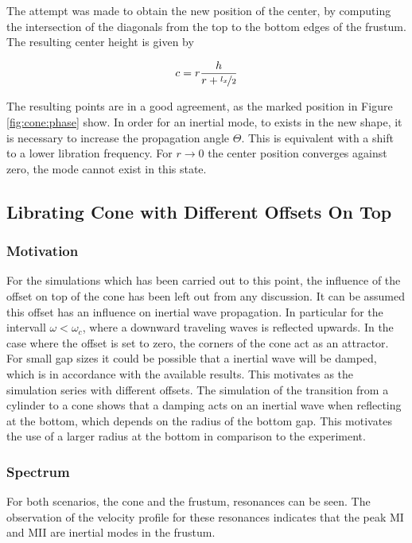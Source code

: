 The attempt was made to obtain the new position of the center,
by computing the intersection of the diagonals from the top to the bottom edges of the frustum.
The resulting center height is given by

\begin{align}
\label{cone:wavenodeeqn}
c  = r \frac{h}{r+\nicefrac{l_x}{2}}
\end{align}

The resulting points are in a good agreement, as the marked position in Figure \ref{fig:cone:phase} show.
In order for an inertial mode, to exists in the new shape, it is necessary to increase the propagation angle $\Theta$.
This is equivalent with a shift to a lower libration frequency.
For $r \rightarrow 0$ the center position converges against zero, the mode cannot exist in this state.

\clearpage

\subsection{Librating Cone with Different Offsets On Top}

\subsubsection{Motivation}

For the simulations which has been carried out to this point,
the influence of the offset on top of the cone has been left out from any discussion.
It can be assumed this offset has an influence on inertial wave propagation.
In particular for the intervall $\omega<\omega_c$, where a downward traveling waves is
reflected upwards.
In the case where the offset is set to zero, the corners of the cone act as an attractor.
For small gap sizes it could be possible that a inertial wave will be damped,
which is in accordance with the available results.
This motivates as the simulation series with different offsets.
The simulation of the transition from a cylinder to a cone shows
that a damping acts on an inertial wave when reflecting at the bottom,
which  depends on the radius of the bottom gap.
This motivates the use of a larger radius at the bottom in comparison to the experiment.

\subsubsection{Spectrum}

For both scenarios, the cone and the frustum, resonances can be seen.
The observation of the velocity profile for these resonances indicates that
the peak M\RN{1} and M\RN{2} are inertial modes in the frustum.

